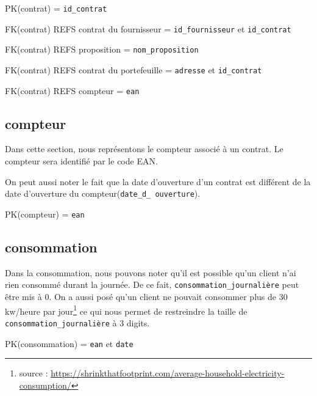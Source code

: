\begin{flushleft}
PK(contrat) = \texttt{id\_contrat}
\end{flushleft}

\begin{flushleft}
FK(contrat) REFS contrat du fournisseur = \texttt{id\_fournisseur} et \texttt{id\_contrat}

FK(contrat) REFS proposition = \texttt{nom\_proposition}

FK(contrat) REFS contrat du portefeuille = \texttt{adresse} et \texttt{id\_contrat}

FK(contrat) REFS compteur = \texttt{ean}
\end{flushleft}
\newpage
\subsection{compteur}
\begin{flushleft}
Dans cette section, nous représentons le compteur associé à un contrat. Le compteur sera identifié par le code EAN. 
\end{flushleft}

\begin{flushleft}
On peut aussi noter le fait que la date d'ouverture d'un contrat est différent de la date d'ouverture du compteur(\texttt{date\_d\_ ouverture}).
\end{flushleft}

\begin{flushleft}
PK(compteur) = \texttt{ean}
\end{flushleft}
\subsection{consommation}
\begin{flushleft}
Dans la consommation, nous pouvons noter qu'il est possible qu'un client n'ai rien consommé durant la journée. De ce fait, \texttt{consommation\_journalière} peut être mis à 0. On a aussi posé qu'un
client ne pouvait consommer plus de 30 kw/heure par jour\footnote{source : \url{https://shrinkthatfootprint.com/average-household-electricity-consumption/}} ce qui nous permet de restreindre la taille de \texttt{consommation\_journalière} à 3 digits.
\end{flushleft}

\begin{flushleft}
PK(consommation) = \texttt{ean} et \texttt{date}
\end{flushleft}

